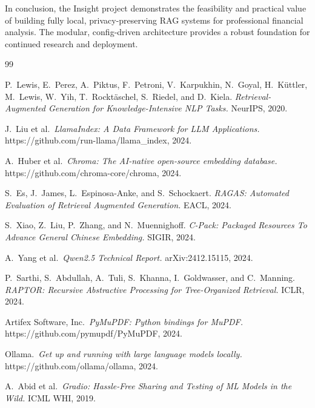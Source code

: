\documentclass[11pt, a4paper]{article}
\begin{document}
\vspace{6pt}
\noindent In conclusion, the Insight project demonstrates the feasibility and practical value of building fully local, privacy-preserving RAG systems for professional financial analysis. The modular, config-driven architecture provides a robust foundation for continued research and deployment.


\begin{thebibliography}{99}

P.~Lewis, E.~Perez, A.~Piktus, F.~Petroni, V.~Karpukhin, N.~Goyal, H.~K\"{u}ttler, M.~Lewis, W.~Yih, T.~Rockt\"{a}schel, S.~Riedel, and D.~Kiela.
\emph{Retrieval-Augmented Generation for Knowledge-Intensive NLP Tasks.}
NeurIPS, 2020.

J.~Liu et al.\ \emph{LlamaIndex: A Data Framework for LLM Applications.}
https://github.com/run-llama/llama\_index, 2024.

A.~Huber et al.\ \emph{Chroma: The AI-native open-source embedding database.}
https://github.com/chroma-core/chroma, 2024.

S.~Es, J.~James, L.~Espinosa-Anke, and S.~Schockaert.
\emph{RAGAS: Automated Evaluation of Retrieval Augmented Generation.}
EACL, 2024.

S.~Xiao, Z.~Liu, P.~Zhang, and N.~Muennighoff.
\emph{C-Pack: Packaged Resources To Advance General Chinese Embedding.}
SIGIR, 2024.

A.~Yang et al.\ \emph{Qwen2.5 Technical Report.}
arXiv:2412.15115, 2024.

P.~Sarthi, S.~Abdullah, A.~Tuli, S.~Khanna, I.~Goldwasser, and C.~Manning.
\emph{RAPTOR: Recursive Abstractive Processing for Tree-Organized Retrieval.}
ICLR, 2024.

Artifex Software, Inc.\ \emph{PyMuPDF: Python bindings for MuPDF.}
https://github.com/pymupdf/PyMuPDF, 2024.

Ollama.\ \emph{Get up and running with large language models locally.}
https://github.com/ollama/ollama, 2024.

A.~Abid et al.\ \emph{Gradio: Hassle-Free Sharing and Testing of ML Models in the Wild.}
ICML WHI, 2019.

\end{thebibliography}
\end{document}
